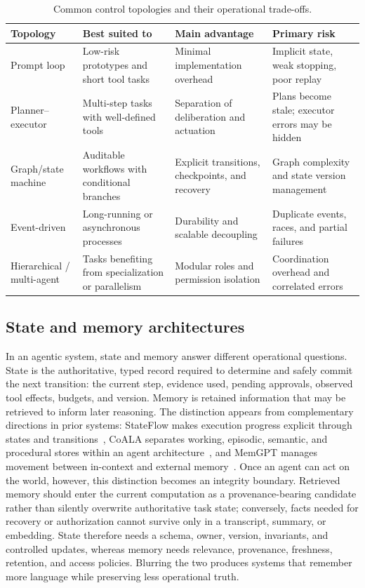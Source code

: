\begin{table}[!htbp]
\centering
\caption{Common control topologies and their operational trade-offs.}
\label{tab:control-topologies}
\small
\surveytableformat
\begin{tabularx}{\textwidth}{L{2.6cm}Y Y Y}
\toprule
{}\textbf{Topology} & \textbf{Best suited to} & \textbf{Main advantage} & \textbf{Primary risk} \\
\midrule
Prompt loop & Low-risk prototypes and short tool tasks & Minimal implementation overhead & Implicit state, weak stopping, poor replay \\
Planner--executor & Multi-step tasks with well-defined tools & Separation of deliberation and actuation & Plans become stale; executor errors may be hidden \\
Graph/state machine & Auditable workflows with conditional branches & Explicit transitions, checkpoints, and recovery & Graph complexity and state version management \\
Event-driven & Long-running or asynchronous processes & Durability and scalable decoupling & Duplicate events, races, and partial failures \\
Hierarchical / multi-agent & Tasks benefiting from specialization or parallelism & Modular roles and permission isolation & Coordination overhead and correlated errors \\
\bottomrule
\end{tabularx}
\end{table}

\subsection{State and memory architectures}
\label{sec:memory}

In an agentic system, state and memory answer different operational questions. State is the authoritative, typed record required to determine and safely commit the next transition: the current step, evidence used, pending approvals, observed tool effects, budgets, and version. Memory is retained information that may be retrieved to inform later reasoning. The distinction appears from complementary directions in prior systems: StateFlow makes execution progress explicit through states and transitions~\cite{wu2024stateflow}, CoALA separates working, episodic, semantic, and procedural stores within an agent architecture~\cite{sumers2024coala}, and MemGPT manages movement between in-context and external memory~\cite{packer2024memgpt}. Once an agent can act on the world, however, this distinction becomes an integrity boundary. Retrieved memory should enter the current computation as a provenance-bearing candidate rather than silently overwrite authoritative task state; conversely, facts needed for recovery or authorization cannot survive only in a transcript, summary, or embedding. State therefore needs a schema, owner, version, invariants, and controlled updates, whereas memory needs relevance, provenance, freshness, retention, and access policies. Blurring the two produces systems that remember more language while preserving less operational truth.

